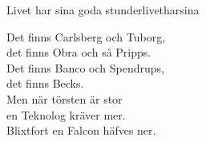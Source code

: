 \begin{song}{Livet har sina goda stunder}{livetharsina}
\begin{vers}
Det finns Carlsberg och Tuborg,\\
det finns Obra och så Pripps.\\
Det finns Banco och Spendrups,\\
det finns Becks.\\
Men när törsten är stor\\
en Teknolog kräver mer.\\
Blixtfort en Falcon häfves ner.\\
\end{vers}
\end{song}
